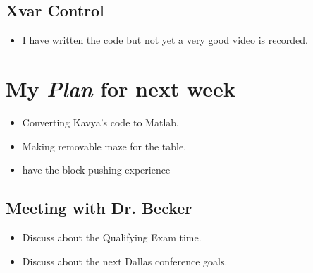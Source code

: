 \subsection{Xvar Control}

\begin{itemize}
\item I have written the code but not yet a very good video is recorded. 
\end{itemize}





\section{My \emph{Plan} for next week}

\begin{itemize}
\item Converting Kavya's code to Matlab.
\item Making removable maze for the table.
\item have the block pushing experience
\end{itemize}

\subsection{Meeting with Dr. Becker  }

\begin{itemize}
\item Discuss about the Qualifying Exam time.
\item Discuss about the next Dallas conference goals.
\end{itemize}


